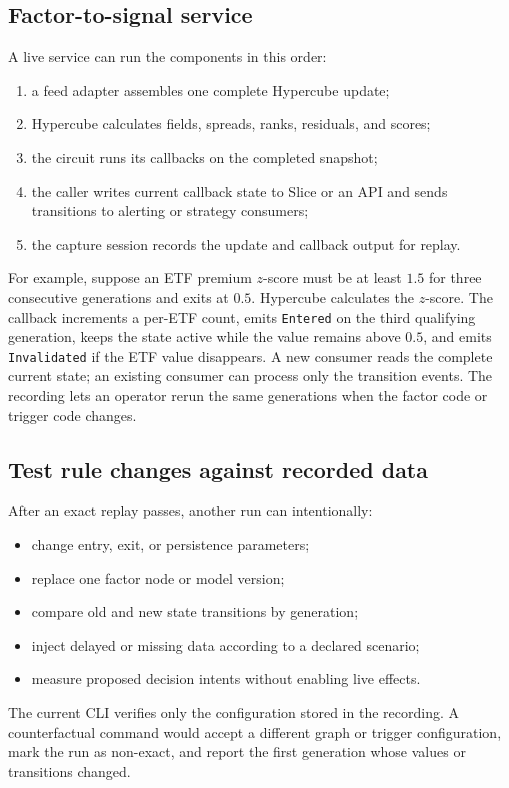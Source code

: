 \documentclass{strategynet-journal}
\newcommand{\SLICE}{\textsf{Slice}}
\begin{document}
\begin{SNcolumns}

\subsection{Factor-to-signal service}

A live service can run the components in this order:
\begin{enumerate}
  \item a feed adapter assembles one complete Hypercube update;
  \item Hypercube calculates fields, spreads, ranks, residuals, and scores;
  \item the circuit runs its callbacks on the completed snapshot;
  \item the caller writes current callback state to \SLICE{} or an API and
        sends transitions to alerting or strategy consumers;
  \item the capture session records the update and callback output for replay.
\end{enumerate}

For example, suppose an ETF premium \(z\)-score must be at least \(1.5\) for
three consecutive generations and exits at \(0.5\).  Hypercube calculates the
\(z\)-score.  The callback increments a per-ETF count, emits
\texttt{Entered} on the third qualifying generation, keeps the state active
while the value remains above \(0.5\), and emits \texttt{Invalidated} if the
ETF value disappears.  A new consumer reads the complete current state;
an existing consumer can process only the transition events.  The recording
lets an operator rerun the same generations when the factor code or trigger
code changes.

\subsection{Test rule changes against recorded data}

After an exact replay passes, another run can intentionally:
\begin{itemize}
  \item change entry, exit, or persistence parameters;
  \item replace one factor node or model version;
  \item compare old and new state transitions by generation;
  \item inject delayed or missing data according to a declared scenario;
  \item measure proposed decision intents without enabling live effects.
\end{itemize}

The current CLI verifies only the configuration stored in the recording.  A
counterfactual command would accept a different graph or trigger
configuration, mark the run as non-exact, and report the first generation
whose values or transitions changed.

\end{SNcolumns}
\end{document}
